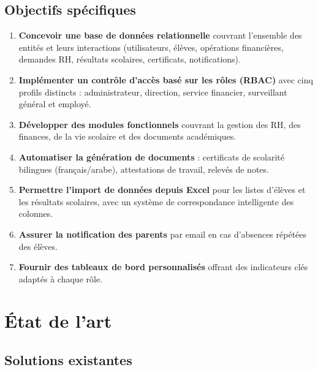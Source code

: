 \documentclass[12pt,a4paper]{report}
\begin{document}
\section{Objectifs spécifiques}

\begin{enumerate}
    \item \textbf{Concevoir une base de données relationnelle} couvrant l'ensemble des entités et leurs interactions (utilisateurs, élèves, opérations financières, demandes RH, résultats scolaires, certificats, notifications).

    \item \textbf{Implémenter un contrôle d'accès basé sur les rôles (RBAC)} avec cinq profils distincts : administrateur, direction, service financier, surveillant général et employé.

    \item \textbf{Développer des modules fonctionnels} couvrant la gestion des RH, des finances, de la vie scolaire et des documents académiques.

    \item \textbf{Automatiser la génération de documents} : certificats de scolarité bilingues (français/arabe), attestations de travail, relevés de notes.

    \item \textbf{Permettre l'import de données depuis Excel} pour les listes d'élèves et les résultats scolaires, avec un système de correspondance intelligente des colonnes.

    \item \textbf{Assurer la notification des parents} par email en cas d'absences répétées des élèves.

    \item \textbf{Fournir des tableaux de bord personnalisés} offrant des indicateurs clés adaptés à chaque rôle.
\end{enumerate}

\chapter{État de l'art}

\section{Solutions existantes}
\end{document}
